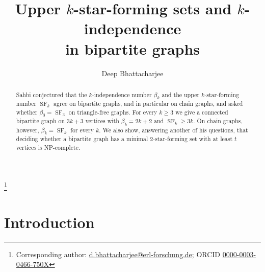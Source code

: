 \documentclass[11pt]{amsart}
\theoremstyle{definition}
\theoremstyle{remark}
\newcommand{\SF}{\operatorname{SF}}
\begin{document}
\title[Upper $k$-star-forming sets in bipartite graphs]{Upper $k$-star-forming sets and $k$-independence\\ in bipartite graphs}

\author{Deep Bhattacharjee}
\address{Formerly, Electro-Gravitational Space Propulsion Laboratory (EGSPL),\newline Bhubaneswar, Odisha 751030, India}
\thanks{Corresponding author: \href{mailto:d.bhattacharjee@erl-forschung.de}{d.bhattacharjee@erl-forschung.de}; ORCID \href{https://orcid.org/0000-0003-0466-750X}{\mbox{0000-0003-0466-750X}}}


\begin{abstract}
Sahbi conjectured that the $k$-independence number $\beta_k$ and the upper $k$-star-forming number $\SF_k$ agree on bipartite graphs, and in particular on chain graphs, and asked whether $\beta_3=\SF_3$ on triangle-free graphs. For every $k\ge3$ we give a connected bipartite graph on $3k+3$ vertices with $\beta_k=2k+2$ and $\SF_k\ge3k$. On chain graphs, however, $\beta_k=\SF_k$ for every $k$. We also show, answering another of his questions, that deciding whether a bipartite graph has a minimal $2$-star-forming set with at least $t$ vertices is NP-complete.
\end{abstract}

\maketitle

\section{Introduction}
\end{document}

